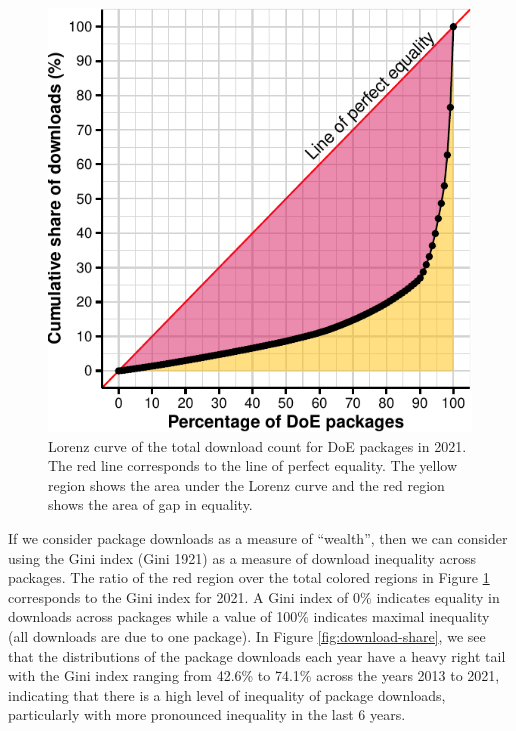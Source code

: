 \documentclass{article}
\begin{document}
\begin{figure}[htbp]

{\centering \includegraphics{figures/plot-lorenz-1} 

}

\caption{Lorenz curve of the total download count for DoE packages in 2021. The red line corresponds to the line of perfect equality. The yellow region shows the area under the Lorenz curve and the red region shows the area of gap in equality.}\label{fig:plot-lorenz}
\end{figure}

If we consider package downloads as a measure of ``wealth'', then we can
consider using the Gini index (Gini 1921) as a measure of download
inequality across packages. The ratio of the red region over the total
colored regions in Figure \ref{fig:plot-lorenz} corresponds to the Gini
index for 2021. A Gini index of 0\% indicates equality in downloads
across packages while a value of 100\% indicates maximal inequality (all
downloads are due to one package). In Figure \ref{fig:download-share},
we see that the distributions of the package downloads each year have a
heavy right tail with the Gini index ranging from 42.6\% to 74.1\%
across the years 2013 to 2021, indicating that there is a high level of
inequality of package downloads, particularly with more pronounced
inequality in the last 6 years.
\end{document}
